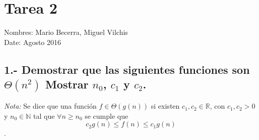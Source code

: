 \documentclass{article}
\begin{document}
\section*{Tarea 2}

Nombres: Mario Becerra, Miguel Vilchis \\
Date: Agosto 2016


\subsection*{1.- Demostrar que las siguientes funciones son $\Theta(n^2)$ Mostrar $n_0$, $c_1$ y $c_2$.}
\textit{Nota:} Se dice que una función  $f \in \Theta(g(n))$ si existen $c_1, c_2 \in \mathbb{R}$, con $c_1, c_2 > 0$ y $n_0 \in \mathbb{N}$ tal que $\forall n \geq n_0$ se cumple que
\[ c_2 g(n) \leq f(n) \leq c_1 g(n) \].
\end{document}

